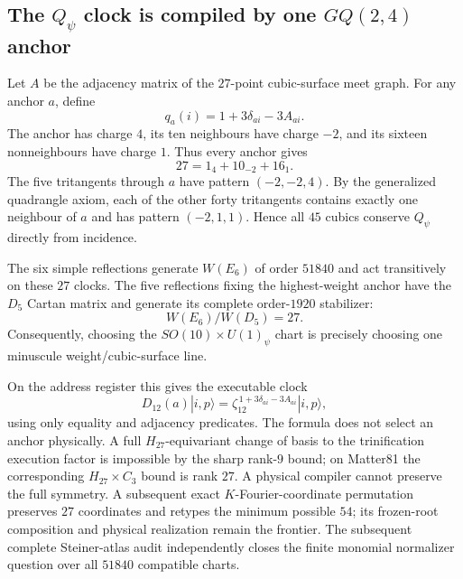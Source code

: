 \subsection*{The $Q_\psi$ clock is compiled by one $GQ(2,4)$ anchor}

Let $A$ be the adjacency matrix of the $27$-point cubic-surface meet graph.
For any anchor $a$, define
\[
\boxed{q_a(i)=1+3\delta_{ai}-3A_{ai}.}
\]
The anchor has charge $4$, its ten neighbours have charge $-2$, and its
sixteen nonneighbours have charge $1$.  Thus every anchor gives
\[
27=1_{4}+10_{-2}+16_{1}.
\]
The five tritangents through $a$ have pattern $(-2,-2,4)$.  By the generalized
quadrangle axiom, each of the other forty tritangents contains exactly one
neighbour of $a$ and has pattern $(-2,1,1)$.  Hence all $45$ cubics conserve
$Q_\psi$ directly from incidence.

The six simple reflections generate $W(E_6)$ of order $51840$ and act
transitively on these $27$ clocks.  The five reflections fixing the
highest-weight anchor have the $D_5$ Cartan matrix and generate its complete
order-$1920$ stabilizer:
\[
\boxed{W(E_6)/W(D_5)=27.}
\]
Consequently, choosing the $SO(10)\times U(1)_\psi$ chart is precisely choosing
one minuscule weight/cubic-surface line.

On the address register this gives the executable clock
\[
D_{12}(a)|i,p\rangle
=\zeta_{12}^{\,1+3\delta_{ai}-3A_{ai}}|i,p\rangle,
\]
using only equality and adjacency predicates.  The formula does not select an
anchor physically.  A full $H_{27}$-equivariant change of basis to the
trinification execution factor is impossible by the sharp rank-$9$ bound; on
Matter81 the corresponding $H_{27}\times C_3$ bound is rank $27$.  A physical
compiler cannot preserve the full symmetry.  A subsequent exact
$K$-Fourier-coordinate permutation preserves $27$ coordinates and retypes the
minimum possible $54$; its frozen-root composition and physical realization
remain the frontier.  The subsequent complete Steiner-atlas audit independently closes
the finite monomial normalizer question over all $51840$ compatible charts.

